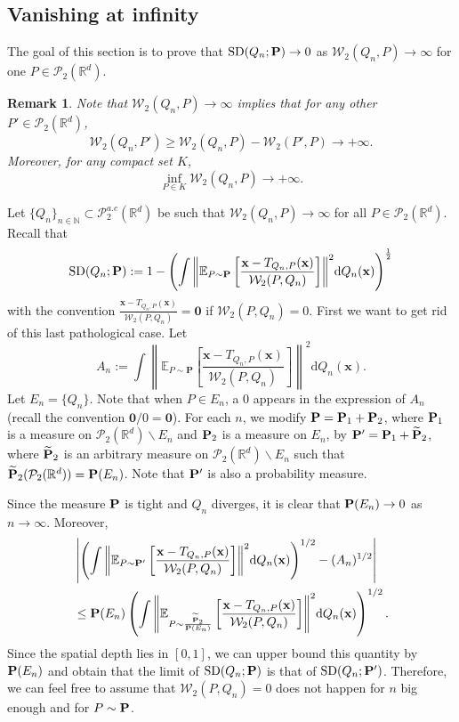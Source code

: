\documentclass{imsart}
\newtheorem {Remark}[Proposition]{Remark}
\numberwithin{equation}{section}
\def\N{\mathbb{N}}
\def\R{\mathbb{R}}
\def\E{\mathbb{E}}
\def\x{\mathbf{x}}
\def\E{\mathbb E}
\def\N{\mathbb N}
\def\x{\mathbf x}
\begin{document}
\subsection{Vanishing at infinity}
The goal of this section is to prove that
$ \mathrm{SD}(Q_n; {\bf P}) \to 0 $ as $ \mathcal{W}_2(Q_n,P)\to \infty$
for one $P\in \mathcal{P}_2(\R^d)$. 
\begin{Remark}\label{RemarkOneToAll}
	Note that $\mathcal{W}_2(Q_n,P)\to \infty$ implies that for any other $P'\in \mathcal{P}_2(\R^d)$, 
	$$ \mathcal{W}_2(Q_n,P') \geq \mathcal{W}_2(Q_n,P)-\mathcal{W}_2(P',P) \to + \infty. $$
	Moreover, for any compact set $K$, 
	$$ \inf_{P\in K} \mathcal{W}_2(Q_n,P)\to + \infty. $$
\end{Remark}
Let $\{Q_n\}_{n\in \N}\subset \mathcal{P}^{a.c}_2(\R^d)$ be such that $ \mathcal{W}_2(Q_n,P)\to \infty$ for all $P\in \mathcal{P}_2(\R^d)$. Recall that 
$$ \mathrm{SD}(Q_n; {\bf P}):=1-  \left(\int{ \left\|\E_{P\sim \mathbf{P}}\left[  \frac{\x-T_{Q_n ,P}(\x) }{\mathcal{W}_2(P,Q_n)}\right]\right\|^2} \mathrm{d}Q_n (\x)\right)^{\frac{1}{2}} $$
with the convention 
$ \frac{\x-T_{Q_n ,P}(\x) }{\mathcal{W}_2(P,Q_n)} =\boldsymbol{0}$
if ${\mathcal{W}_2(P,Q_n)} =0$. First we want to get rid of this last pathological case. 
Let
\begin{equation}
	\label{eq:An}
	A_n:=\int{\left\|\E_{P\sim \mathbf{P}}\left[  \frac{\x-T_{Q_{n} ,P}(\x) }{\mathcal{W}_2(P,Q_{n})}\right]\right\|^2} \mathrm{d}Q_{n} (\x).
\end{equation}
Let $E_n = \{Q_{n}\}$.
Note that when $P \in E_n$, a $0$ appears in the expression of $A_n$
(recall the convention $\boldsymbol{0}/0 = \boldsymbol{0}$).
For each $n$, we modify ${\bf P}={\bf P}_1+ {\bf P}_2$, where ${\bf P}_1$ is a measure on $\mathcal{P}_2(\R^d) \backslash E_n$ and ${\bf P}_2$ is a measure on $E_n$,
by ${\bf P}'={\bf P}_1+{\bf \widetilde{P}}_2$, 
where ${\bf \widetilde{P}}_2$ is an arbitrary measure on $\mathcal{P}_2(\R^d) \backslash E_n$ such that ${\bf \widetilde{P}}_2(\mathcal{P}_2(\R^d) ) = {\bf P}(E_n)$. Note that ${\bf P}'$ is also a probability measure. 

Since the measure ${\bf P}$ is tight
and $Q_n$ diverges, it is clear that  ${\bf P}(E_n) \to 0$ as $n \to \infty$. Moreover, 
\begin{align*}
	& \left|
	\left(
	\int{\left\|\E_{P\sim \mathbf{P}'}\left[  \frac{\x-T_{Q_{n} ,P}(\x) }{\mathcal{W}_2(P,Q_{n})}\right]\right\|^2} \mathrm{d}Q_{n} (\x)
	\right)^{1/2}
	-(A_n)^{1/2}
	\right| 
	\\ 
	& \le{\bf P}(E_n)
	\left(
	\int{\left\|
		\E_{P\sim \frac{{\bf \widetilde{P}}_2}{{\bf P}(E_n)}}
		\left[ 
		\frac{\x-T_{Q_{n} ,P}(\x) }{\mathcal{W}_2(P,Q_{n})}\right]\right\|^2} \mathrm{d}Q_{n} (\x)
	\right)^{1/2}.
\end{align*}
Since the spatial depth lies in $[0,1]$, we can upper bound this quantity by 
${\bf P}(E_n)$ and obtain that the limit of $\mathrm{SD}(Q_{n}; {\bf P})$ is that of $\mathrm{SD}(Q_{n}; {\bf P}')$. Therefore, we can feel free to assume that ${\mathcal{W}_2(P,Q_n)} =0$ does not happen for $n$ big enough and for $P \sim {\bf P}$. 
\end{document}
